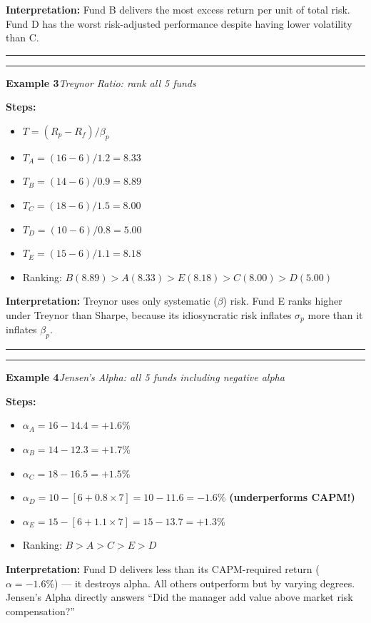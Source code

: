 \documentclass[
]{article}
\begin{document}
\noindent\textbf{Interpretation:} Fund B delivers the most excess return per unit of total risk. Fund D has the worst risk-adjusted performance despite having lower volatility than C.

\noindent\rule{\linewidth}{0.4pt}
\medskip
\noindent\rule{\linewidth}{0.4pt}
\noindent\textbf{Example 3}\enspace\textit{Treynor Ratio: rank all 5 funds}

\noindent\textbf{Steps:}
\begin{itemize}\setlength{\itemsep}{3pt}
  \item $T = (R_p - R_f)/\beta_p$
  \item $T_A = (16-6)/1.2 = 8.33$
  \item $T_B = (14-6)/0.9 = 8.89$
  \item $T_C = (18-6)/1.5 = 8.00$
  \item $T_D = (10-6)/0.8 = 5.00$
  \item $T_E = (15-6)/1.1 = 8.18$
  \item Ranking: $B(8.89) > A(8.33) > E(8.18) > C(8.00) > D(5.00)$
\end{itemize}

\noindent\textbf{Interpretation:} Treynor uses only systematic ($\beta$) risk. Fund E ranks higher under Treynor than Sharpe, because its idiosyncratic risk inflates $\sigma_p$ more than it inflates $\beta_p$.

\noindent\rule{\linewidth}{0.4pt}
\medskip
\noindent\rule{\linewidth}{0.4pt}
\noindent\textbf{Example 4}\enspace\textit{Jensen's Alpha: all 5 funds including negative alpha}

\noindent\textbf{Steps:}
\begin{itemize}\setlength{\itemsep}{3pt}
  \item $\alpha_A = 16-14.4 = +1.6\%$
  \item $\alpha_B = 14-12.3 = +1.7\%$
  \item $\alpha_C = 18-16.5 = +1.5\%$
  \item $\alpha_D = 10-[6+0.8\times7] = 10-11.6 = -1.6\%$ \textbf{(underperforms CAPM!)}
  \item $\alpha_E = 15-[6+1.1\times7] = 15-13.7 = +1.3\%$
  \item Ranking: $B > A > C > E > D$
\end{itemize}

\noindent\textbf{Interpretation:} Fund D delivers less than its CAPM-required return ($\alpha=-1.6\%$) --- it destroys alpha. All others outperform but by varying degrees. Jensen's Alpha directly answers ``Did the manager add value above market risk compensation?''
\end{document}
